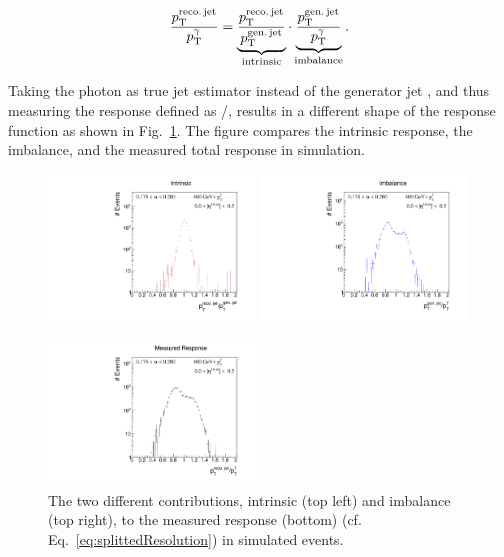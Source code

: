 \begin{equation}\label{eq:splittedResolution}
\frac{{p}_\mathrm{T}^{\text{reco.\,jet}}}{{p}_\mathrm{T}^{\gamma}} = \underbrace{\frac{{p}_\mathrm{T}^{\text{reco.\,jet}}}{{p}_\mathrm{T}^{\text{gen.\,jet}}}}_{\text{intrinsic}} \cdot \underbrace{\frac{{p}_\mathrm{T}^{\text{gen.\,jet}}}{{p}_\mathrm{T}^{\gamma}}}_{\text{imbalance}}.
\end{equation}

Taking the photon \pt as true jet \pt estimator instead of the generator jet \pt, and thus measuring the response defined as \ptrecojet/\ptgamma, results in a different shape of the response function as shown in Fig.~\ref{fig:responseExamples}. 
The figure compares the intrinsic response, the imbalance, and the measured total response in simulation. 

\begin{figure}[t]
 \centering
     \includegraphics[width=0.49\textwidth]{figures/resolution/methodology/intrinsicExample.pdf}
     \includegraphics[width=0.49\textwidth]{figures/resolution/methodology/imbalanceExample.pdf}

     \includegraphics[width=0.49\textwidth]{figures/resolution/methodology/fullResponseExample.pdf}
  \caption{The two different contributions, intrinsic (top left) and imbalance (top right), to the measured response (bottom) (cf. Eq.~\eqref{eq:splittedResolution}) in simulated events.}  
 \label{fig:responseExamples}
\end{figure}


